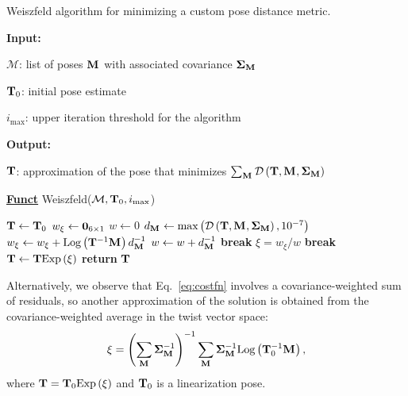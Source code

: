 \newcommand{\iterth}{i_\text{max}}
\newcommand{\xinew}{\xi_{\text{new}}}
\newcommand{\dmtx}{d_{\Mtx{}}}
\begin{algorithm}
	\caption[Weiszfeld algorithm.]{Weiszfeld algorithm for minimizing a custom pose distance metric.}
	\label{alg:weiszfeld}

	\textbf{Input:}
	\begin{compactitem}
		\item $\mathcal{M}$: list of poses $\mathbf{M}_{}$ with associated covariance $\mathbf{\Sigma}_{\mathbf{M}}$
		\item $\mathbf{T}_0$: initial pose estimate
		\item $\iterth$: upper iteration threshold for the algorithm
	\end{compactitem}
	\textbf{Output:}
	\begin{compactitem}
		\item $\mathbf{T}$: approximation of the pose that minimizes $\sum_{\mathbf{M}_{}} \mathcal{D}\left({\mathbf{T}, \mathbf{M}_{}, \mathbf{\Sigma}_{\mathbf{M}}}\right)$
	\end{compactitem}
	\textbf{\underline{Funct}} Weiszfeld($\mathcal{M}, \pose_0, \iterth$)
	\begin{algorithmic}[1] %
		\State $\mathbf{T} \leftarrow \mathbf{T}_0$
		\For{$i=1, \dots, \iterth$}
		\State $w_{\xi}  \leftarrow \mathbf{0}_{6 \times 1}$
		\State $w  \leftarrow 0$
		\State $\dmtx \leftarrow \text{max}\left(\dfunc{\pose, \Mtx{}, \CovM}, 10^{-7}\right)$ 
		\State $w_{\xi} \leftarrow w_{\xi} + \Logmap{\pose^{-1} \Mtx{}}\dmtx^{-1}$
		\State $w \leftarrow w+ \dmtx^{-1}$
		\EndFor
		\State \textbf{break} 
		\EndIf
		\State $\xi = w_{\xi} / w$
		\State \textbf{break} 
		\EndIf
		\State $\mathbf{T} \leftarrow \mathbf{T} \text{Exp}\left({\xi}\right)$
		\EndFor
		\State \textbf{return} $\mathbf{T}$
	\end{algorithmic}
\end{algorithm}

Alternatively, we observe that Eq.~\ref{eq:costfn} involves a covariance-weighted sum of residuals, so another approximation of the solution is obtained from the covariance-weighted average in the twist vector space:
\begin{equation}
	\xi = \left(\sum_{\mathbf{M}_{}}\mathbf{\Sigma}_{\mathbf{M}}^{-1}\right)^{-1}
	\sum_{\mathbf{M}_{}}\mathbf{\Sigma}_{\mathbf{M}}^{-1}\text{Log}\left({\mathbf{T}_0^{-1} \mathbf{M}_{}}\right)
	\text{,}
\end{equation}
where $\mathbf{T} = \mathbf{T}_0 \text{Exp}\left({\xi}\right)$ and $\mathbf{T}_0$ is a linearization pose.

